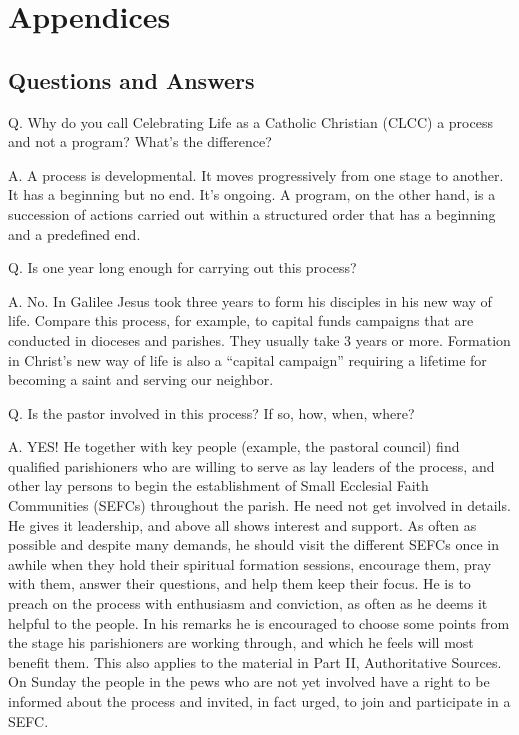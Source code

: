 \documentclass[oneside]{book}
\begin{document}

\appendix \setcounter{secnumdepth}{-2}
\part{Appendices}


\chapter{Questions and Answers}

Q. Why do you call Celebrating Life as a Catholic Christian (CLCC) a process and
not a program? What's the difference?

A. A process is developmental. It moves progressively from one stage to
another. It has a beginning but no end. It's ongoing. A program, on the other
hand, is a succession of actions carried out within a structured order that has
a beginning and a predefined end.

Q. Is one year long enough for carrying out this process?

A. No. In Galilee Jesus took three years to form his disciples in his new way of
life. Compare this process, for example, to capital funds campaigns that are
conducted in dioceses and parishes. They usually take 3 years or more. Formation
in Christ's new way of life is also a ``capital campaign'' requiring a lifetime
for becoming a saint and serving our neighbor.

Q. Is the pastor involved in this process? If so, how, when, where?

A. YES! He together with key people (example, the pastoral council) find
qualified parishioners who are willing to serve as lay leaders of the process,
and other lay persons to begin the establishment of Small Ecclesial Faith
Communities (SEFCs) throughout the parish. He need not get involved in
details. He gives it leadership, and above all shows interest and support.
As often as possible and despite many demands, he should visit the different
SEFCs once in awhile when they hold their spiritual formation sessions,
encourage them, pray with them, answer their questions, and help them keep their
focus.
He is to preach on the process with enthusiasm and conviction, as often as he
deems it helpful to the people. In his remarks he is encouraged to choose some
points from the stage his parishioners are working through, and which he feels
will most benefit them. This also applies to the material in Part II,
Authoritative Sources. On Sunday the people in the pews who are not yet involved
have a right to be informed about the process and invited, in fact urged, to
join and participate in a SEFC.
\end{document}

